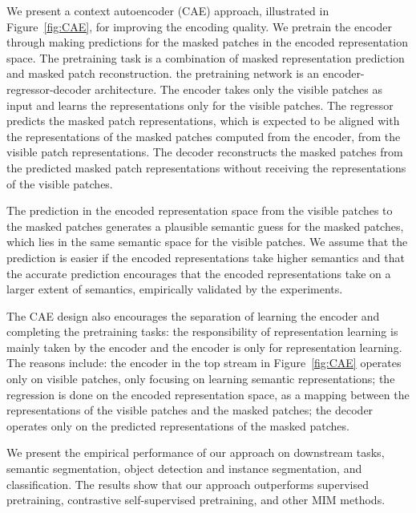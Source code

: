 \documentclass[twocolumn]{svjour3}          \smartqed  \usepackage{graphicx}
\begin{document}
We present a context autoencoder (CAE) approach,
illustrated in Figure~\ref{fig:CAE},
for improving the encoding quality.
We pretrain the encoder
through making predictions for the masked patches
in the encoded representation space.
The pretraining task
is a combination of masked representation prediction
and masked patch reconstruction.
the pretraining network
is an encoder-regressor-decoder architecture.
The encoder
takes only the visible patches as input
and learns the representations
only for the visible patches.
The regressor
predicts the masked patch representations,
which is expected to
be aligned with the representations
of the masked patches computed from the encoder,
from the visible patch representations.
The decoder reconstructs 
the masked patches
from the predicted masked patch representations
without receiving the representations
of the visible patches.




The prediction in the encoded representation space
from the visible patches
to the masked patches
generates a plausible semantic guess
for the masked patches,
which lies in 
the same semantic space
for the visible patches.
We assume that 
the prediction is easier
if the encoded representations take higher semantics
and 
that the accurate prediction encourages
that the encoded representations
take on a larger extent of semantics,
empirically validated
by the experiments.


The CAE design also encourages 
the separation
of learning the encoder
and completing the pretraining tasks:
the responsibility
of representation learning is 
mainly
taken by the encoder
and the encoder is only for representation learning.
The reasons include: the encoder in the top stream in Figure~\ref{fig:CAE}
operates only on visible patches,
only focusing on learning semantic representations;
the regression is done
on the encoded representation space,
as a mapping between the representations
of the visible patches 
and the masked patches;
the decoder operates
only on the predicted representations
of the masked patches.



We present the empirical performance of our approach
on downstream tasks, semantic segmentation, object detection and instance segmentation, and classification.
The results show that our approach outperforms supervised pretraining, contrastive self-supervised pretraining, and other MIM methods.
\end{document}
